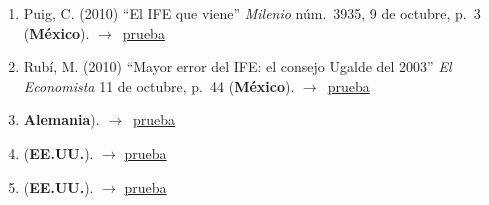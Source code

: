 \documentclass[12 pt, letter]{article}
\newenvironment{CitasMiTrabajo}{
    \begin{footnotesize}
    \begin{enumerate}[label={\footnotesize\emph{cita~\arabic*}},ref=\arabic*] %
        \setlength{\itemsep}{.1\itemsep}
        \setlength{\parskip}{.1\parskip}
    }{\end{enumerate}\end{footnotesize}}
\begin{document}
        \begin{CitasMiTrabajo}

        \item Puig, C. (2010)
        ``El
        IFE que viene'' \emph{Milenio} n\'um.\ 3935, 9 de octubre, p.~3 (\textbf{M\'exico}). $\rightarrow$~\href{https://github.com/emagar/cv/blob/master/citasMiTrab/magarEtalIFEDinam/puig.pdf}{prueba}

        \item Rub\'i, M. (2010)
        ``Mayor error del IFE: el consejo Ugalde del 2003'' \emph{El Economista} 11 de octubre, p.~44 (\textbf{M\'exico}). $\rightarrow$~\href{https://github.com/emagar/cv/blob/master/citasMiTrab/magarEtalIFEDinam/rubi.pdf}{prueba}

        \item {} {\textbf{Alemania}}). $\rightarrow$~\href{https://github.com/emagar/cv/blob/master/citasMiTrab/magarEtalIFEDinam/lara2015.pdf}{prueba}

        \item {} (\textbf{EE.UU.}). $\rightarrow$ \href{https://doi.org/10.1089/elj.2018.0512}{prueba}

        \item {} (\textbf{EE.UU.}). $\rightarrow$ \href{https://doi.org/10.1080/13510347.2019.1641797}{prueba}
          
        \label{ncites:magar.estevez.rosas.2010} %

        \end{CitasMiTrabajo}







\end{document}
